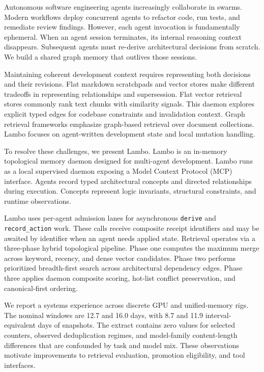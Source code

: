 \documentclass[10pt,twocolumn]{article}
\begin{document}
Autonomous software engineering agents increasingly collaborate in swarms.
Modern workflows deploy concurrent agents to refactor code, run tests, and remediate review findings.
However, each agent invocation is fundamentally ephemeral.
When an agent session terminates, its internal reasoning context disappears.
Subsequent agents must re-derive architectural decisions from scratch.
We build a shared graph memory that outlives those sessions.

Maintaining coherent development context requires representing both decisions and their revisions.
Flat markdown scratchpads and vector stores make different tradeoffs in representing relationships and supersession.
Flat vector retrieval stores \cite{lewis2020rag, zhong2023memorybank, xiao2024survey} commonly rank text chunks with similarity signals.
This daemon explores explicit typed edges for codebase constraints and invalidation context.
Graph retrieval frameworks \cite{edge2024graphrag, gutierrez2024hipporag} emphasize graph-based retrieval over document collections.
Lambo focuses on agent-written development state and local mutation handling.

To resolve these challenges, we present Lambo.
Lambo is an in-memory topological memory daemon designed for multi-agent development.
Lambo runs as a local supervised daemon exposing a Model Context Protocol (MCP) interface.
Agents record typed architectural concepts and directed relationships during execution.
Concepts represent logic invariants, structural constraints, and runtime observations.

Lambo uses per-agent admission lanes for asynchronous \texttt{derive} and \texttt{record\_action} work.
These calls receive composite receipt identifiers and may be awaited by identifier when an agent needs applied state.
Retrieval operates via a three-phase hybrid topological pipeline.
Phase one computes the maximum merge across keyword, recency, and dense vector candidates.
Phase two performs prioritized breadth-first search across architectural dependency edges.
Phase three applies daemon composite scoring, hot-list conflict preservation, and canonical-first ordering.

We report a systems experience across discrete GPU and unified-memory rigs.
The nominal windows are 12.7 and 16.0 days, with 8.7 and 11.9 interval-equivalent days of snapshots.
The extract contains zero values for selected counters, observed deduplication regimes, and model-family content-length differences that are confounded by task and model mix.
These observations motivate improvements to retrieval evaluation, promotion eligibility, and tool interfaces.
\end{document}

